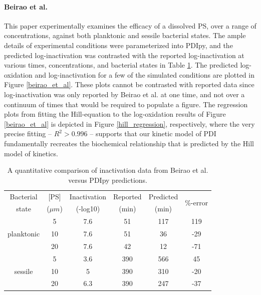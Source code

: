 
\paragraph{Beirao et al.\cite{Beirao2014PhotodynamicPorphyrin}}
This paper experimentally examines the efficacy of a dissolved PS, over a range of concentrations, against both planktonic and sessile bacterial states. The ample details of experimental conditions were parameterized into PDIpy, and the predicted log-inactivation was contrasted with the reported log-inactivation at various times, concentrations, and bacterial states in Table \ref{beirao_et_al_data}. The predicted log-oxidation and log-inactivation for a few of the simulated conditions are plotted in Figure \ref{beirao_et_al}. These plots cannot be contrasted with reported data since log-inactivation was only reported by Beirao et al. at one time, and not over a continuum of times that would be required to populate a figure. The regression plots from fitting the Hill-equation to the log-oxidation results of Figure \ref{beirao_et_al} is depicted in Figure \ref{hill_regression}, respectively, where the very precise fitting -- $R^2 > 0.996$ -- supports that our kinetic model of PDI fundamentally recreates the biochemical relationship that is predicted by the Hill model of kinetics.

\begin{table}[h]
    \centering
    \begin{tabular}{c|c|c|c|c|c}
        Bacterial & [PS] & Inactivation & Reported & Predicted & \multirow{2}{1.2cm}{\%-error}\\
        state & ($\mu m$) & (-log10) & (min) & (min) & \\
        \toprule
        \multirow{3}{1.5cm}{planktonic} & 5 & 7.6 & 51 & 117 & 119\\
        & 10 & 7.6 & 51 & 36 & -29\\
        & 20 & 7.6 & 42 & 12 & -71\\
        \midrule
        \multirow{3}{1.5cm}{sessile} & 5 & 3.6 & 390 & 566 & 45\\
        & 10 & 5 & 390 & 310 & -20\\
        & 20 & 6.3 & 390 & 247 & -37\\
        \bottomrule
    \end{tabular}
    \caption{
        A quantitative comparison of inactivation data from Beirao et al. versus PDIpy predictions. 
    }
    \label{beirao_et_al_data}
\end{table}

